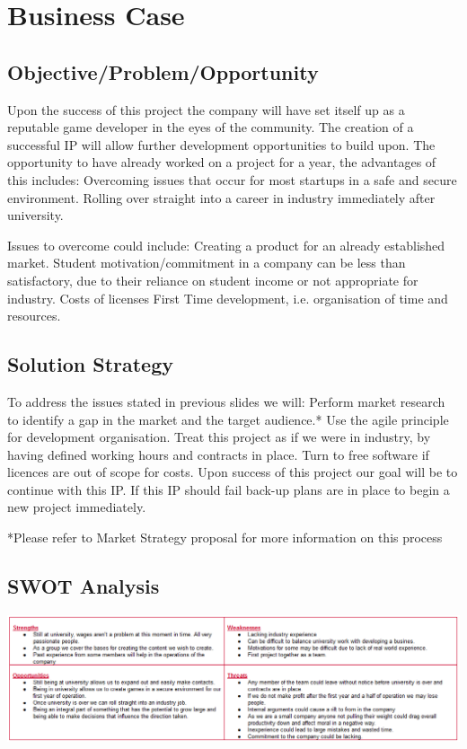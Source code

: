\documentclass{scrartcl}
\begin{document}
\section{Business Case}
\subsection{Objective/Problem/Opportunity}
Upon the success of this project the company will have set itself up as a reputable game developer in the eyes of the community.
The creation of a successful IP will allow further development opportunities to build upon.
The opportunity to have already worked on a project for a year, the advantages of this includes:
Overcoming issues that occur for most startups in a safe and secure environment. 
Rolling over straight into a career in industry immediately after university.

Issues to overcome could include:
Creating a product for an already established market.
Student motivation/commitment in a company can be less than satisfactory, due to their reliance on student income or not appropriate for industry.
Costs of licenses
First Time development, i.e. organisation of time and resources.
\subsection{Solution Strategy }
To address the issues stated in previous slides we will:
Perform market research to identify a gap in the market and the target audience.*
Use the agile principle for development organisation.
Treat this project as if we were in industry, by having defined working hours and contracts in place.
Turn to free software if licences are out of scope for costs.
Upon success of this project our goal will be to continue with this IP.
If this IP should fail back-up plans are in place to begin a new project immediately.

*Please refer to Market Strategy proposal for more information on this process

\subsection{SWOT Analysis}
\begin{center}
	\includegraphics[scale=0.4]{SWOT}	
	\newline
\end{center}
\end{document}
